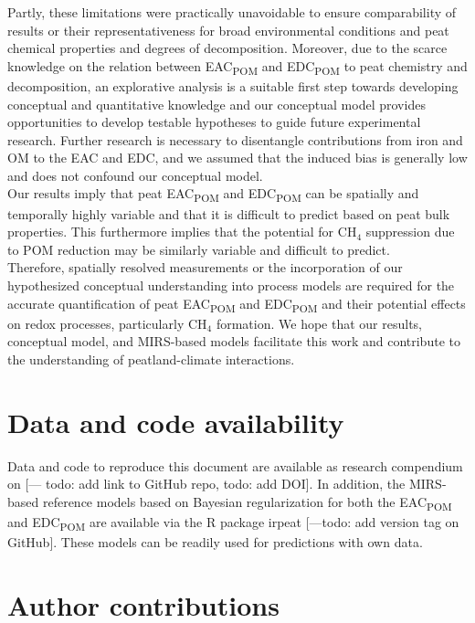 \documentclass[alpha-refs, lineno]{wiley-article-rmd}
\begin{document}
Partly, these limitations were practically unavoidable to ensure comparability of results or their representativeness for broad environmental conditions and peat chemical properties and degrees of decomposition. Moreover, due to the scarce knowledge on the relation between EAC\textsubscript{POM} and EDC\textsubscript{POM} to peat chemistry and decomposition, an explorative analysis is a suitable first step towards developing conceptual and quantitative knowledge and our conceptual model provides opportunities to develop testable hypotheses to guide future experimental research. Further research is necessary to disentangle contributions from iron and OM to the EAC and EDC, and we assumed that the induced bias is generally low and does not confound our conceptual model.\\
Our results imply that peat EAC\textsubscript{POM} and EDC\textsubscript{POM} can be spatially and temporally highly variable and that it is difficult to predict based on peat bulk properties. This furthermore implies that the potential for CH\(_4\) suppression due to POM reduction may be similarly variable and difficult to predict.\\
Therefore, spatially resolved measurements or the incorporation of our hypothesized conceptual understanding into process models are required for the accurate quantification of peat EAC\textsubscript{POM} and EDC\textsubscript{POM} and their potential effects on redox processes, particularly CH\(_4\) formation. We hope that our results, conceptual model, and MIRS-based models facilitate this work and contribute to the understanding of peatland-climate interactions.

\hypertarget{data-and-code-availability}{%
\section*{Data and code availability}\label{data-and-code-availability}}

Data and code to reproduce this document are available as research compendium on {[}--- todo: add link to GitHub repo, todo: add DOI{]}. In addition, the MIRS-based reference models based on Bayesian regularization for both the EAC\textsubscript{POM} and EDC\textsubscript{POM} are available via the R package irpeat \autocite{Teickner.2020b} {[}---todo: add version tag on GitHub{]}. These models can be readily used for predictions with own data.

\hypertarget{author-contributions}{%
\section*{Author contributions}\label{author-contributions}}
\end{document}
